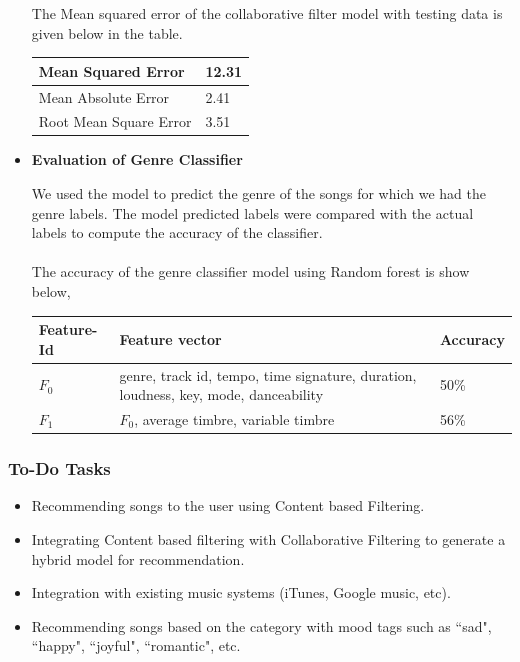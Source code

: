 \documentclass{sig-alternate-05-2015}
\begin{document}
\begin{itemize}
The Mean squared error of the collaborative filter model with testing data is given below in the table.
\begin{center}
\begin{tabular} { |p{4.4cm}|p{2cm}| } 
\hline Mean Squared Error & 12.31 \\
\hline Mean Absolute Error & 2.41 \\
\hline Root Mean Square Error & 3.51 \\
\hline
\end{tabular}
\end{center}
    
    \item \textbf{Evaluation of Genre Classifier}
    
    We used the model to predict the genre of the songs for which we had the genre labels. The model predicted labels were compared with the actual labels to compute the accuracy of the classifier.\\\\
    The accuracy of the genre classifier model using Random forest is show below,

\begin{center}
\begin{tabular} { |p{2cm}|p{3cm}|p{1.5cm}| } 
\hline \textbf{Feature-Id} & \textbf{Feature vector} &\textbf{Accuracy} \\
\hline $F_0$ & genre, track id, tempo, time signature, duration, loudness, key, mode, danceability & 50\% \\
\hline $F_1$ & $F_0$, average timbre, variable timbre & 56\% \\
\hline
\end{tabular}
\end{center}
\end{itemize}


\subsubsection{To-Do Tasks}
\begin{itemize}
    \item Recommending songs to the user using Content based Filtering.
    \item Integrating Content based filtering with Collaborative Filtering to generate a hybrid model for recommendation.
    \item Integration with existing music systems (iTunes, Google music, etc).
    \item Recommending songs based on the category with mood tags such as ``sad", ``happy", ``joyful", ``romantic", etc.\\
\end{itemize}
\end{document}

